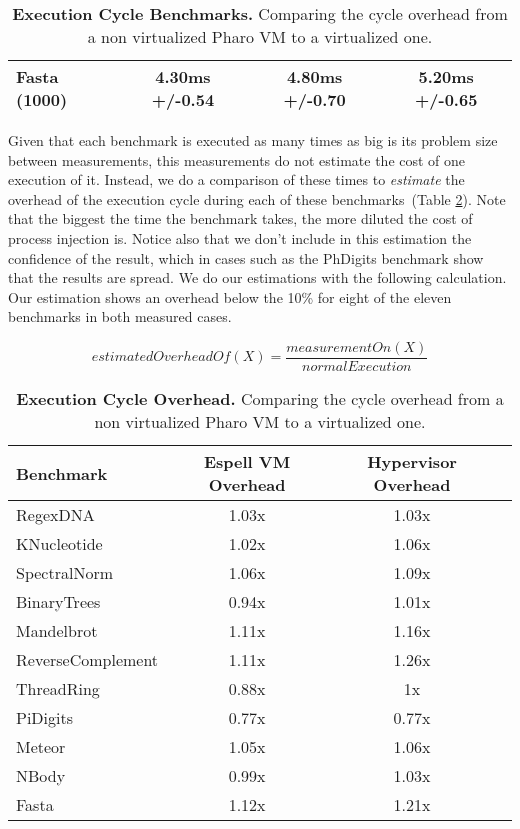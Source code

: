 \begin{table}[ht]
\begin{tabular}{lccc}
		Fasta (1000) & 4.30ms +/-0.54 & 4.80ms +/-0.70 & 5.20ms +/-0.65 \\\bottomrule%
 	\end{tabular}
	\vspace*{0.2cm}
 	\caption{\textbf{Execution Cycle Benchmarks.} Comparing the cycle overhead from a non virtualized Pharo VM to a virtualized one.\label{tb:benchmarks}}
 \end{table}
 
Given that each benchmark is executed as many times as big is its problem size between measurements, this measurements do not estimate the cost of one execution of it. Instead, we do a comparison of these times to \emph{estimate} the overhead of the execution cycle during each of these benchmarks~(Table \ref{tb:benchmarks_comparison}). Note that the biggest the time the benchmark takes, the more diluted the cost of process injection is. Notice also that we don't include in this estimation the confidence of the result, which in cases such as the PhDigits benchmark show that the results are spread. We do our estimations with the following calculation. Our estimation shows an overhead below the 10\% for eight of the eleven benchmarks in both measured cases.

\begin{equation*}
estimatedOverheadOf(X) = \frac{measurementOn(X)}{normalExecution}
\end{equation*}

\begin{table}[ht]

 	\centering
 	\begin{tabular}{lccc}%
			\toprule
			\textbf{Benchmark}
 			& \textbf{Espell VM Overhead}
			& \textbf{Hypervisor Overhead}\\
		\midrule
		RegexDNA & 1.03x & 1.03x \\\midrule
		KNucleotide & 1.02x & 1.06x \\\midrule
		SpectralNorm & 1.06x & 1.09x \\\midrule
		BinaryTrees & 0.94x & 1.01x  \\\midrule
		Mandelbrot & 1.11x & 1.16x \\\midrule
		ReverseComplement & 1.11x & 1.26x \\\midrule
		ThreadRing & 0.88x & 1x \\\midrule
		PiDigits & 0.77x & 0.77x \\\midrule
		Meteor & 1.05x & 1.06x \\\midrule
		NBody & 0.99x & 1.03x \\\midrule
		Fasta & 1.12x & 1.21x \\\bottomrule
 	\end{tabular}
	\vspace*{0.2cm}
 	\caption{\textbf{Execution Cycle Overhead.} Comparing the cycle overhead from a non virtualized Pharo VM to a virtualized one.\label{tb:benchmarks_comparison}}
\end{table}

